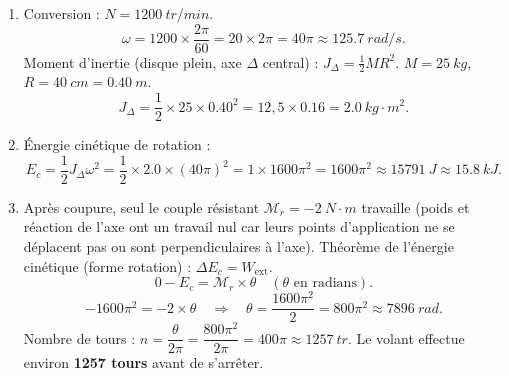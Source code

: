 \documentclass[11pt]{article}
\begin{document}
\begin{corrige}
\begin{enumerate}
\item Conversion : $N = \SI{1200}{tr/min}$.
\[
\omega = 1200 \times \frac{2\pi}{60} = 20 \times 2\pi = 40\pi \approx \SI{125,7}{rad/s}.
\]
Moment d'inertie (disque plein, axe $\Delta$ central) : $J_{\Delta} = \frac{1}{2}MR^2$.
$M = \SI{25}{kg}$, $R = \SI{40}{cm} = \SI{0,40}{m}$.
\[
J_{\Delta} = \frac{1}{2} \times 25 \times \num{0,40}^2 = 12,5 \times \num{0,16} = \SI{2,0}{kg\cdot m^2}.
\]
\item Énergie cinétique de rotation :
\[
E_c = \frac{1}{2}J_{\Delta}\omega^2 = \frac{1}{2} \times \num{2,0} \times (40\pi)^2 = 1 \times 1600\pi^2 = 1600\pi^2 \approx \SI{15791}{J} \approx \SI{15,8}{kJ}.
\]
\item Après coupure, seul le couple résistant $\mathcal{M}_r = -\SI{2}{N\cdot m}$ travaille (poids et réaction de l'axe ont un travail nul car leurs points d'application ne se déplacent pas ou sont perpendiculaires à l'axe).
Théorème de l'énergie cinétique (forme rotation) : $\Delta E_c = W_{\text{ext}}$.
\[
0 - E_c = \mathcal{M}_r \times \theta \quad (\theta \text{ en radians}).
\]
\[
-1600\pi^2 = -2 \times \theta \quad \Rightarrow \quad \theta = \frac{1600\pi^2}{2} = 800\pi^2 \approx \SI{7896}{rad}.
\]
Nombre de tours : $n = \dfrac{\theta}{2\pi} = \dfrac{800\pi^2}{2\pi} = 400\pi \approx \SI{1257}{tr}$.
Le volant effectue environ \textbf{1257 tours} avant de s'arrêter.
\end{enumerate}
\end{corrige}
\end{document}
